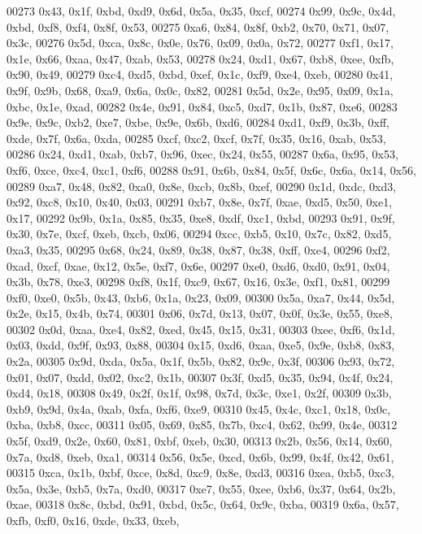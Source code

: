 \begin{DoxyCode}
00273   0x43, 0x1f, 0xbd, 0xd9, 0x6d, 0x5a, 0x35, 0xcf,
00274   0x99, 0x9c, 0x4d, 0xbd, 0xf8, 0xf4, 0x8f, 0x53,
00275   0xa6, 0x84, 0x8f, 0xb2, 0x70, 0x71, 0x07, 0x3c,
00276   0x5d, 0xca, 0x8c, 0x0e, 0x76, 0x09, 0x0a, 0x72,
00277   0xf1, 0x17, 0x1e, 0x66, 0xaa, 0x47, 0xab, 0x53,
00278   0x24, 0xd1, 0x67, 0xb8, 0xee, 0xfb, 0x90, 0x49,
00279   0xc4, 0xd5, 0xbd, 0xef, 0x1c, 0xf9, 0xe4, 0xeb,
00280   0x41, 0x9f, 0x9b, 0x68, 0xa9, 0x6a, 0x0c, 0x82,
00281   0x5d, 0x2e, 0x95, 0x09, 0x1a, 0xbc, 0x1e, 0xad,
00282   0x4e, 0x91, 0x84, 0xc5, 0xd7, 0x1b, 0x87, 0xe6,
00283   0x9e, 0x9c, 0xb2, 0xe7, 0xbe, 0x9e, 0x6b, 0xd6,
00284   0xd1, 0xf9, 0x3b, 0xff, 0xde, 0x7f, 0x6a, 0xda,
00285   0xcf, 0xc2, 0xcf, 0x7f, 0x35, 0x16, 0xab, 0x53,
00286   0x24, 0xd1, 0xab, 0xb7, 0x96, 0xec, 0x24, 0x55,
00287   0x6a, 0x95, 0x53, 0xf6, 0xce, 0xc4, 0xc1, 0xf6,
00288   0x91, 0x6b, 0x84, 0x5f, 0x6c, 0x6a, 0x14, 0x56,
00289   0xa7, 0x48, 0x82, 0xa0, 0x8e, 0xcb, 0x8b, 0xef,
00290   0x1d, 0xdc, 0xd3, 0x92, 0xc8, 0x10, 0x40, 0x03,
00291   0xb7, 0x8e, 0x7f, 0xae, 0xd5, 0x50, 0xe1, 0x17,
00292   0x9b, 0x1a, 0x85, 0x35, 0xe8, 0xdf, 0xc1, 0xbd,
00293   0x91, 0x9f, 0x30, 0x7e, 0xcf, 0xeb, 0xcb, 0x06,
00294   0xcc, 0xb5, 0x10, 0x7c, 0x82, 0xd5, 0xa3, 0x35,
00295   0x68, 0x24, 0x89, 0x38, 0x87, 0x38, 0xff, 0xe4,
00296   0xf2, 0xad, 0xcf, 0xae, 0x12, 0x5e, 0xf7, 0x6e,
00297   0xe0, 0xd6, 0xd0, 0x91, 0x04, 0x3b, 0x78, 0xe3,
00298   0xf8, 0x1f, 0xc9, 0x67, 0x16, 0x3e, 0xf1, 0x81,
00299   0xf0, 0xe0, 0x5b, 0x43, 0xb6, 0x1a, 0x23, 0x09,
00300   0x5a, 0xa7, 0x44, 0x5d, 0x2e, 0x15, 0x4b, 0x74,
00301   0x06, 0x7d, 0x13, 0x07, 0x0f, 0x3e, 0x55, 0xe8,
00302   0x0d, 0xaa, 0xe4, 0x82, 0xed, 0x45, 0x15, 0x31,
00303   0xee, 0xf6, 0x1d, 0x03, 0xdd, 0x9f, 0x93, 0x88,
00304   0x15, 0xd6, 0xaa, 0xe5, 0x9e, 0xb8, 0x83, 0x2a,
00305   0x9d, 0xda, 0x5a, 0x1f, 0x5b, 0x82, 0x9c, 0x3f,
00306   0x93, 0x72, 0x01, 0x07, 0xdd, 0x02, 0xc2, 0x1b,
00307   0x3f, 0xd5, 0x35, 0x94, 0x4f, 0x24, 0xd4, 0x18,
00308   0x49, 0x2f, 0x1f, 0x98, 0x7d, 0x3c, 0xe1, 0x2f,
00309   0x3b, 0xb9, 0x9d, 0x4a, 0xab, 0xfa, 0xf6, 0xe9,
00310   0x45, 0x4c, 0xc1, 0x18, 0x0c, 0xba, 0xb8, 0xcc,
00311   0x05, 0x69, 0x85, 0x7b, 0xc4, 0x62, 0x99, 0x4e,
00312   0x5f, 0xd9, 0x2e, 0x60, 0x81, 0xbf, 0xeb, 0x30,
00313   0x2b, 0x56, 0x14, 0x60, 0x7a, 0xd8, 0xeb, 0xa1,
00314   0x56, 0x5e, 0xcd, 0x6b, 0x99, 0x4f, 0x42, 0x61,
00315   0xca, 0x1b, 0xbf, 0xce, 0x8d, 0xc9, 0x8e, 0xd3,
00316   0xea, 0xb5, 0xc3, 0x5a, 0x3e, 0xb5, 0x7a, 0xd0,
00317   0xe7, 0x55, 0xee, 0xb6, 0x37, 0x64, 0x2b, 0xae,
00318   0x8c, 0xbd, 0x91, 0xbd, 0x5c, 0x64, 0x9c, 0xba,
00319   0x6a, 0x57, 0xfb, 0xf0, 0x16, 0xde, 0x33, 0xeb,

\end{DoxyCode}
